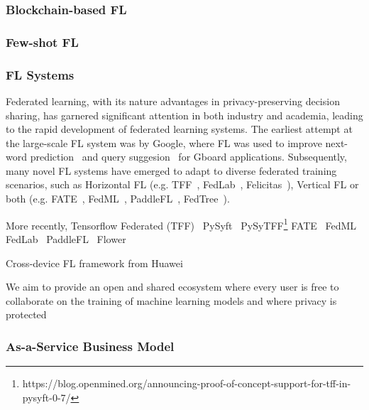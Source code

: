 \subsubsection{Blockchain-based FL}

\subsubsection{Few-shot FL}

\subsubsection{FL Systems}
Federated learning, with its nature advantages in privacy-preserving decision sharing, has garnered significant attention in both industry and academia, leading to the rapid development of federated learning systems.
The earliest attempt at the large-scale FL system was by Google, where FL was used to improve next-word prediction~\cite{hard2018federated} and query suggesion~\cite{yang2018applied} for Gboard applications.
Subsequently, many novel FL systems have emerged to adapt to diverse federated training scenarios, such as Horizontal FL (e.g. TFF~\cite{abadi2016tensorflow}, FedLab~\cite{zeng2021fedlab}, Felicitas~\cite{zhang2022felicitas}), Vertical FL or both (e.g. FATE~\cite{liu2021fate}, FedML~\cite{he2020fedml}, PaddleFL~\cite{ma2019paddlepaddle}, FedTree~\cite{li2022fedtree}).


More recently, 
Tensorflow Federated (TFF)~\cite{abadi2016tensorflow}
PySyft~\cite{ziller2021pysyft}
PySyTFF\footnote{https://blog.openmined.org/announcing-proof-of-concept-support-for-tff-in-pysyft-0-7/}
FATE~\cite{liu2021fate}
FedML~\cite{he2020fedml}
FedLab~\cite{zeng2021fedlab}
PaddleFL~\cite{ma2019paddlepaddle}
Flower~\cite{beutel2020flower}

Cross-device FL framework from Huawei~\cite{zhang2022felicitas}

We aim to provide an open and shared ecosystem where every user is free to collaborate on the training of machine learning models and where privacy is protected

\subsubsection{As-a-Service Business Model}


